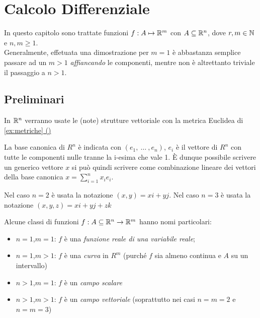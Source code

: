 \chapter{Calcolo Differenziale}

In questo capitolo sono trattate funzioni $f: A \mapsto \mathbb{R}^m$ con $A \subseteq \mathbb{R}^n$, dove $r,m \in \mathbb{N}$ e $n,m \geq 1$.\\
Generalmente, effetuata una dimostrazione per $m = 1$ è abbastanza semplice passare ad un $m > 1$ \textit{affiancando} le componenti, mentre non è altrettanto triviale il passaggio a $n > 1$.

\section{Preliminari}
In $\mathbb{R}^n$ verranno usate le (note) strutture vettoriale con la metrica Euclidea di \hyperref[ex:dist_eucl]{\cref*{ex:metriche} ()} %

La base canonica di $R^n$ è indicata con $(e_1,\:\dotsc\:,e_n)$, $e_i$ è il vettore di $R^n$ con tutte le componenti nulle tranne la i-esima che vale 1. È dunque possibile scrivere un generico vettore $x$ si può quindi scrivere come combinazione lineare dei vettori della base canonica $x=\sum\limits_{i=1}^{n} x_i e_i$.

Nel caso $n=2$ è usata la notazione $(x,y)=xi+yj$. Nel caso $n=3$ è usata la notazione $(x,y,z)=xi+yj+zk$

Alcune classi di funzioni $f:A\subseteq\mathbb{R}^n\rightarrow\mathbb{R}^m$ hanno nomi particolari:
\begin{itemize}
	\item $n=1$,$m=1$: $f$ è una \textit{funzione reale di una variabile reale};
	\item $n=1$,$m>1$: $f$ è una \textit{curva} in $R^m$ (purché $f$ sia almeno continua e $A$ su un intervallo)
	\item $n>1$,$m=1$: $f$ è un \textit{campo scalare}
	\item $n>1$,$m>1$: $f$ è un \textit{campo vettoriale} (soprattutto nei casi $n=m=2$ e $n=m=3$)
\end{itemize}

\newpage
